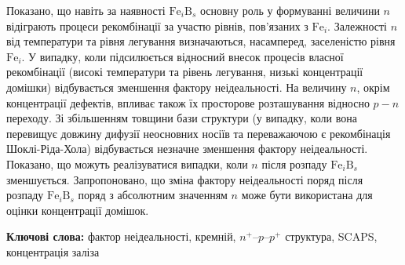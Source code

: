 \documentclass[12pt]{article}
\begin{document}
Показано, що навіть за наявності $\mathrm{Fe}_i\mathrm{B}_s$ основну роль у формуванні величини $n$
відіграють процеси рекомбінації за участю рівнів, пов'язаних з $\mathrm{Fe}_i$.
Залежності $n$ від температури та рівня легування визначаються, насамперед,
заселеністю рівня $\mathrm{Fe}_i$.
У випадку, коли підсилюється відносний внесок процесів власної рекомбінації (високі 
температури та рівень легування, низькі концентрації домішки) відбувається зменшення фактору неідеальності.
На величину $n$, окрім концентрації дефектів, впливає також їх просторове розташування відносно $p-n$ переходу.
Зі збільшенням товщини бази структури (у випадку, коли вона перевищує довжину дифузії неосновних носіїв та
переважаючою є рекомбінація Шоклі-Ріда-Хола) відбувається незначне зменшення фактору неідеальності.
Показано, що можуть реалізуватися випадки, коли $n$ після розпаду $\mathrm{Fe}_i\mathrm{B}_s$ зменшується.
Запропоновано, що зміна фактору неідеальності поряд після розпаду $\mathrm{Fe}_i\mathrm{B}_s$ поряд з абсолютним значенням $n$  може бути використана
для оцінки концентрації домішок.


\textbf{Ключові слова:}
фактор неідеальності, кремній, $n^+$--$p$--$p^+$ структура, SCAPS, концентрація заліза
\end{document}
